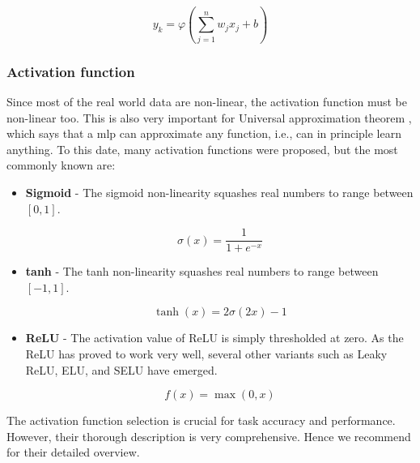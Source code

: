             \begin{equation}
                y_k = \varphi \left(\sum\limits_{j=1}^n w_j x_j + b \right)
            \end{equation}
        
        \subsubsection{Activation function}
            Since most of the real world data are non-linear, the activation function must be non-linear too. This is also very important for Universal approximation theorem \cite{hornik1989multilayer}, which says that a \gls{mlp} can approximate any function, i.e., can in principle learn anything. To this date, many activation functions were proposed, but the most commonly known are:
            
           \begin{itemize}
                \item \textbf{Sigmoid} - The sigmoid non-linearity squashes real numbers to range between $[0,1]$.
                
                \begin{equation}
                   \sigma(x) = \frac{1}{1 + e^{-x}}
                \end{equation}
                
                \item \textbf{tanh} - The tanh non-linearity squashes real numbers to range between $[-1,1]$.
                
                \begin{equation}
                    \tanh(x) =  2\sigma(2x) - 1
                \end{equation}
                
                \item \textbf{ReLU} - The activation value of ReLU is simply thresholded at zero. As the ReLU has proved to work very well, several other variants such as Leaky ReLU, ELU, and SELU have emerged.
                
                \begin{equation}
                    f(x) = \max(0, x)
                \end{equation}
            \end{itemize}
    
            The activation function selection is crucial for task accuracy and performance. However, their thorough description is very comprehensive. Hence we recommend \cite{cs231n} for their detailed overview.

